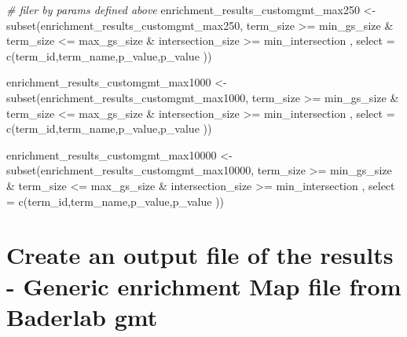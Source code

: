 \documentclass[
]{book}
\newenvironment{Shaded}{\begin{snugshade}}{\end{snugshade}}
\newcommand{\AttributeTok}[1]{\textcolor[rgb]{0.77,0.63,0.00}{#1}}
\newcommand{\CommentTok}[1]{\textcolor[rgb]{0.56,0.35,0.01}{\textit{#1}}}
\newcommand{\FunctionTok}[1]{\textcolor[rgb]{0.00,0.00,0.00}{#1}}
\newcommand{\NormalTok}[1]{#1}
\newcommand{\OtherTok}[1]{\textcolor[rgb]{0.56,0.35,0.01}{#1}}
\newcommand{\SpecialCharTok}[1]{\textcolor[rgb]{0.00,0.00,0.00}{#1}}
\begin{document}
\begin{Shaded}
\begin{Highlighting}[]
\CommentTok{\# filer by params defined above}
\NormalTok{enrichment\_results\_customgmt\_max250 }\OtherTok{\textless{}{-}} \FunctionTok{subset}\NormalTok{(enrichment\_results\_customgmt\_max250,}
\NormalTok{                                       term\_size }\SpecialCharTok{\textgreater{}=}\NormalTok{ min\_gs\_size }\SpecialCharTok{\&} 
\NormalTok{                                   term\_size }\SpecialCharTok{\textless{}=}\NormalTok{ max\_gs\_size }\SpecialCharTok{\&} 
\NormalTok{                                   intersection\_size }\SpecialCharTok{\textgreater{}=}\NormalTok{ min\_intersection , }
                                 \AttributeTok{select =} \FunctionTok{c}\NormalTok{(term\_id,term\_name,p\_value,p\_value ))}

\NormalTok{enrichment\_results\_customgmt\_max1000 }\OtherTok{\textless{}{-}} \FunctionTok{subset}\NormalTok{(enrichment\_results\_customgmt\_max1000,}
\NormalTok{                                       term\_size }\SpecialCharTok{\textgreater{}=}\NormalTok{ min\_gs\_size }\SpecialCharTok{\&} 
\NormalTok{                                   term\_size }\SpecialCharTok{\textless{}=}\NormalTok{ max\_gs\_size }\SpecialCharTok{\&} 
\NormalTok{                                   intersection\_size }\SpecialCharTok{\textgreater{}=}\NormalTok{ min\_intersection , }
                                 \AttributeTok{select =} \FunctionTok{c}\NormalTok{(term\_id,term\_name,p\_value,p\_value ))}

\NormalTok{enrichment\_results\_customgmt\_max10000 }\OtherTok{\textless{}{-}} \FunctionTok{subset}\NormalTok{(enrichment\_results\_customgmt\_max10000,}
\NormalTok{                                       term\_size }\SpecialCharTok{\textgreater{}=}\NormalTok{ min\_gs\_size }\SpecialCharTok{\&} 
\NormalTok{                                   term\_size }\SpecialCharTok{\textless{}=}\NormalTok{ max\_gs\_size }\SpecialCharTok{\&} 
\NormalTok{                                   intersection\_size }\SpecialCharTok{\textgreater{}=}\NormalTok{ min\_intersection , }
                                 \AttributeTok{select =} \FunctionTok{c}\NormalTok{(term\_id,term\_name,p\_value,p\_value ))}
\end{Highlighting}
\end{Shaded}

\hypertarget{create-an-output-file-of-the-results---generic-enrichment-map-file-from-baderlab-gmt}{%
\section{Create an output file of the results - Generic enrichment Map file from Baderlab gmt}\label{create-an-output-file-of-the-results---generic-enrichment-map-file-from-baderlab-gmt}}
\end{document}
